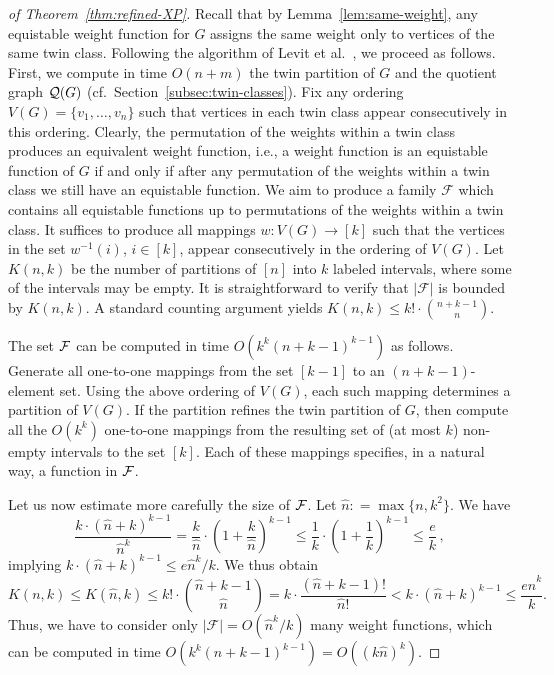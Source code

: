 \documentclass{llncs}
\begin{document}
\begin{proof}[of Theorem~\ref{thm:refined-XP}]
Recall that by Lemma~\ref{lem:same-weight}, any equistable weight function for $G$ assigns the same weight only to vertices of the same twin class. Following the algorithm of Levit et al.~\cite{MR3040147}, we proceed as follows.
First, we compute in time $O(n+m)$ the twin partition of $G$
and the quotient graph ${\cal Q}(G)$ (cf.~Section~\ref{subsec:twin-classes}).
Fix any ordering $V(G) = \{v_1,\ldots,v_n\}$ such that vertices in each twin class appear consecutively in this ordering. Clearly, the permutation of the weights within a twin class produces an equivalent weight function, i.e., a weight function is an equistable function of $G$ if and only if after any permutation of the weights within a twin class we still have an equistable function. We aim to produce a family $\mathcal{F}$ which contains all equistable functions up to permutations of the weights within a twin class. It suffices to produce all mappings $w : V(G) \rightarrow [k]$ such that the vertices in the set $w^{-1}(i)$, $i \in [k]$, appear consecutively in the ordering of $V(G)$. Let $K(n,k)$ be the number of partitions of $[n]$ into $k$ labeled intervals, where some of the intervals may be empty. It is straightforward to verify that $|\mathcal{F}|$ is bounded by $K(n,k)$.
A standard counting argument yields $K(n,k) \le k! \cdot {n+k-1 \choose n}$.

The set ${\cal F}$ can be computed in time $O(k^k(n+k-1)^{k-1})$ as follows.
Generate all one-to-one mappings from the set $[k-1]$ to an $(n+k-1)$-element set. Using the above ordering of $V(G)$,
each such mapping determines a partition of $V(G)$. If the partition refines the twin partition of $G$, then compute all the $O(k^k)$ one-to-one mappings from the resulting set of (at most $k$) non-empty intervals to the set $[k]$. Each of these mappings specifies, in a natural way, a function in ${\cal F}$.

Let us now estimate more carefully the size of ${\cal F}$. Let $\hat{n} : = \max\{n,k^2\}$. We have
\[\frac{k \cdot (\hat{n}+k)^{k-1}}{\hat{n}^k}=\frac{k}{\hat{n}} \cdot \left(1+\frac{k}{\hat{n}}\right)^{k-1} \le \frac{1}{k} \cdot \left(1+\frac{1}{k}\right)^{k-1} \le \frac{e}{k}\,,\]
implying $k \cdot (\hat{n}+k)^{k-1} \le  e \hat{n}^k/k$.
We thus obtain
\[K(n,k) \le K(\hat{n},k) \le k! \cdot {\hat{n}+k-1 \choose \hat n} = k \cdot \frac{(\hat{n}+k-1)!}{\hat{n}!} < k \cdot (\hat{n}+k)^{k-1} \le  \frac{e \hat{n}^k}{k}.\]
Thus, we have to consider only $|\mathcal{F}|=O(\hat{n}^k/k)$ many weight functions, which
can be computed in time
$O(k^k(n+k-1)^{k-1}) = O((k\hat n)^k)$.


\end{proof}
\end{document}
